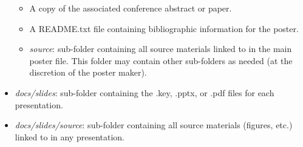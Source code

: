 \documentclass{tufte-book} %
\begin{document}
\begin{itemize}
\begin{itemize}
  \item A copy of the associated conference abstract or paper.
  \item A README.txt file containing bibliographic information for the
    poster.
  \item \textit{source}: sub-folder containing all source materials
    linked to in the main poster file.  This folder may contain other
    sub-folders as needed (at the discretion of the poster maker).
\end{itemize}
\item \textit{docs/slides}: sub-folder containing the .key, .pptx, or
  .pdf files for each presentation.
\item \textit{docs/slides/source}: sub-folder containing all source
  materials (figures, etc.) linked to in any presentation.
\end{itemize}



\end{document}
